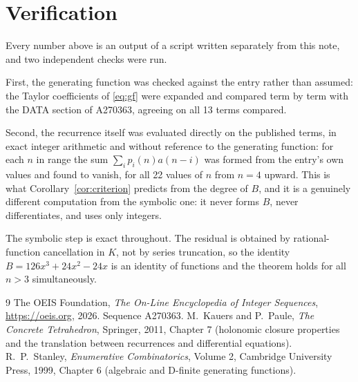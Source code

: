 \documentclass[11pt,a4paper]{article}
\theoremstyle{plain}
\theoremstyle{definition}
\begin{document}
\section{Verification}

Every number above is an output of a script written separately from this note, and two
independent checks were run.

First, the generating function was checked against the entry rather than assumed: the
Taylor coefficients of \eqref{eq:gf} were expanded and compared term by term with the DATA
section of A270363, agreeing on all 13 terms compared.

Second, the recurrence itself was evaluated directly on the published terms, in exact
integer arithmetic and without reference to the generating function: for each $n$ in range
the sum $\sum_{i}p_{i}(n)a(n-i)$ was formed from the entry's own values and found to
vanish, for all 22 values of $n$ from $n=4$ upward. This is what
Corollary~\ref{cor:criterion} predicts from the degree of $B$, and it is a genuinely
different computation from the symbolic one: it never forms $B$, never differentiates, and
uses only integers.

The symbolic step is exact throughout. The residual is obtained by rational-function
cancellation in $K$, not by series truncation, so the identity $B=126 x^{3} + 24 x^{2} - 24 x$ is an
identity of functions and the theorem holds for all $n>3$ simultaneously.

\begin{thebibliography}{9}
 The OEIS Foundation, \emph{The On-Line Encyclopedia of Integer Sequences},
\url{https://oeis.org}, 2026. Sequence A270363.
 M.~Kauers and P.~Paule, \emph{The Concrete Tetrahedron}, Springer, 2011,
Chapter 7 (holonomic closure properties and the translation between recurrences and
differential equations).
 R.~P.~Stanley, \emph{Enumerative Combinatorics}, Volume 2, Cambridge
University Press, 1999, Chapter 6 (algebraic and D-finite generating functions).
\end{thebibliography}
\end{document}

